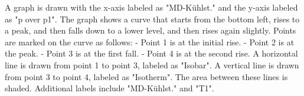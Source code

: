 A graph is drawn with the x-axis labeled as "MD-Kühlst." and the y-axis labeled as "p over p1". The graph shows a curve that starts from the bottom left, rises to a peak, and then falls down to a lower level, and then rises again slightly. Points are marked on the curve as follows:
- Point 1 is at the initial rise.
- Point 2 is at the peak.
- Point 3 is at the first fall.
- Point 4 is at the second rise.
A horizontal line is drawn from point 1 to point 3, labeled as "Isobar". A vertical line is drawn from point 3 to point 4, labeled as "Isotherm". The area between these lines is shaded. Additional labels include "MD-Kühlst." and "T1".